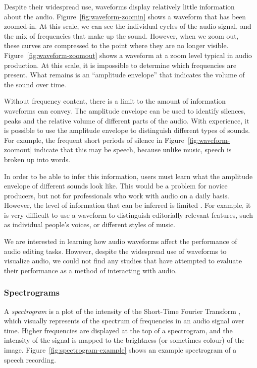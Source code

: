 Despite their widespread use, waveforms display relatively little information about the audio.
Figure~\ref{fig:waveform-zoomin} shows a waveform that has been zoomed-in. At this scale, we can see the individual
cycles of the audio signal, and the mix of frequencies that make up the sound.  However, when we zoom out, these
curves are compressed to the point where they are no longer visible.  Figure~\ref{fig:waveform-zoomout} shows a
waveform at a zoom level typical in audio production. At this scale, it is impossible to determine which frequencies
are present.  What remains is an ``amplitude envelope'' that indicates the volume of the sound over time.

Without frequency content, there is a limit to the amount of information waveforms can convey.  The amplitude envelope 
can be used to identify silences, peaks and the relative volume of different parts of the audio.  With experience, it
is possible to use the amplitude envelope to distinguish different types of sounds. For example, the frequent short
periods of silence in Figure~\ref{fig:waveform-zoomout} indicate that this may be speech, because unlike music, speech
is broken up into words.

In order to be able to infer this information, users must learn what the amplitude envelope of different sounds look
like. This would be a problem for novice producers, but not for professionals who work with audio on a daily basis.
However, the level of information that can be inferred is limited \citep[p.~114]{Hausman2012}. For example, it is very
difficult to use a waveform to distinguish editorially relevant features, such as individual people's voices, or different styles of
music.

We are interested in learning how audio waveforms affect the performance of audio editing tasks. However, despite the
widespread use of waveforms to visualize audio, we could not find any studies that have attempted to evaluate their
performance as a method of interacting with audio.

\subsubsection{Spectrograms}\label{sec:background-spectrograms}

A \textit{spectrogram} is a plot of the intensity of the Short-Time Fourier Transform \citep{Smith2007}, which visually
represents of the spectrum of frequencies in an audio signal over time. Higher frequencies are displayed at the top of
a spectrogram, and the intensity of the signal is mapped to the brightness (or sometimes colour) of the image.
Figure~\ref{fig:spectrogram-example} shows an example spectrogram of a speech recording.


